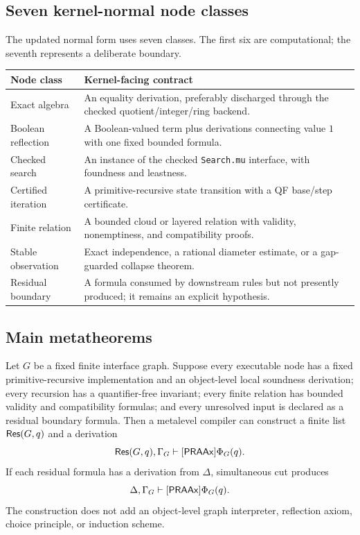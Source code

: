 \subsection{Seven kernel-normal node classes}

The updated normal form uses seven classes.  The first six are computational; the seventh represents a deliberate boundary.
\begin{center}
\begin{tabularx}{\textwidth}{@{}p{}X@{}}
\toprule
Node class & Kernel-facing contract \\
\midrule
Exact algebra & An equality derivation, preferably discharged through the checked quotient/integer/ring backend. \\
Boolean reflection & A Boolean-valued term plus derivations connecting value \(1\) with one fixed bounded formula. \\
Checked search & An instance of the checked \texttt{Search.mu} interface, with foundness and leastness. \\
Certified iteration & A primitive-recursive state transition with a QF base/step certificate. \\
Finite relation & A bounded cloud or layered relation with validity, nonemptiness, and compatibility proofs. \\
Stable observation & Exact independence, a rational diameter estimate, or a gap-guarded collapse theorem. \\
Residual boundary & A formula consumed by downstream rules but not presently produced; it remains an explicit hypothesis. \\
\bottomrule
\end{tabularx}
\end{center}

\subsection{Main metatheorems}

\begin{theorem}\label{thm:residual-main}
Let \(G\) be a fixed finite interface graph.  Suppose every executable node has a fixed primitive-recursive implementation and an object-level local soundness derivation; every recursion has a quantifier-free invariant; every finite relation has bounded validity and compatibility formulas; and every unresolved input is declared as a residual boundary formula.  Then a metalevel compiler can construct a finite list \(\mathsf{Res}(G,q)\) and a derivation
\[
  \mathsf{Res}(G,q),\Gamma_G\vdash[\mathsf{PRAAx}]\Phi_G(q).
\]
If each residual formula has a derivation from \(\Delta\), simultaneous cut produces
\[
  \Delta,\Gamma_G\vdash[\mathsf{PRAAx}]\Phi_G(q).
\]
The construction does not add an object-level graph interpreter, reflection axiom, choice principle, or induction scheme.
\end{theorem}


